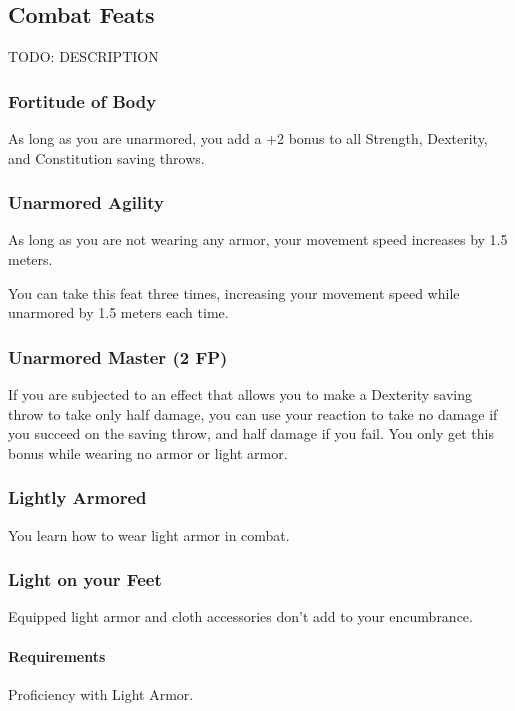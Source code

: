 \subsection*{Combat Feats}
TODO: DESCRIPTION

\subsubsection{Fortitude of Body} \label{feat::fortitudeofbody}
    As long as you are unarmored, you add a +2 bonus to all Strength, Dexterity, and Constitution saving throws.
\subsubsection{Unarmored Agility} \label{feat::unarmoredagility}
    As long as you are not wearing any armor, your movement speed increases by 1.5 meters.

    You can take this feat three times, increasing your movement speed while unarmored by 1.5 meters each time.
\subsubsection{Unarmored Master (2 FP)} \label{feat::unarmoredmaster}
    If you are subjected to an effect that allows you to make a Dexterity saving throw to take only half damage, you can use your reaction to take no damage if you succeed on the saving throw, and half damage if you fail.
    You only get this bonus while wearing no armor or light armor.
\subsubsection{Lightly Armored} \label{feat::lightlyarmored}
    You learn how to wear light armor in combat.
\subsubsection{Light on your Feet} \label{feat::lightonyourfeet}
    Equipped light armor and cloth accessories don't add to your encumbrance.
    \paragraph{Requirements} Proficiency with Light Armor.
